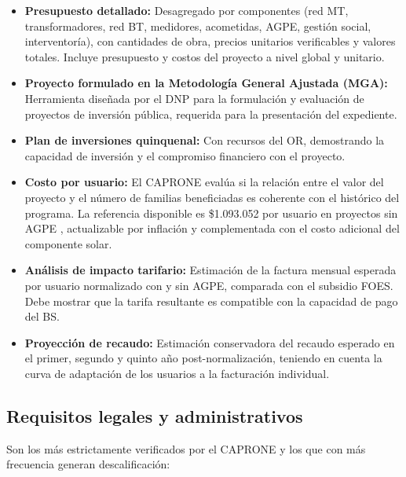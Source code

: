 \begin{itemize}
    \item \textbf{Presupuesto detallado:} Desagregado por componentes
    (red MT, transformadores, red BT, medidores, acometidas, AGPE,
    gestión social, interventoría), con cantidades de obra, precios
    unitarios verificables y valores totales. Incluye presupuesto y
    costos del proyecto a nivel global y unitario.

    \item \textbf{Proyecto formulado en la Metodología General Ajustada
    (MGA):} Herramienta diseñada por el DNP para la formulación y
    evaluación de proyectos de inversión pública, requerida para la
    presentación del expediente.

    \item \textbf{Plan de inversiones quinquenal:} Con recursos del OR,
    demostrando la capacidad de inversión y el compromiso financiero
    con el proyecto.

    \item \textbf{Costo por usuario:} El CAPRONE evalúa si la relación
    entre el valor del proyecto y el número de familias beneficiadas es
    coherente con el histórico del programa. La referencia disponible
    es \$1.093.052 por usuario en proyectos sin AGPE
    \parencite{CabralesSanjuan2015}, actualizable por inflación y
    complementada con el costo adicional del componente solar.

    \item \textbf{Análisis de impacto tarifario:} Estimación de la
    factura mensual esperada por usuario normalizado con y sin AGPE,
    comparada con el subsidio FOES. Debe mostrar que la tarifa
    resultante es compatible con la capacidad de pago del BS.

    \item \textbf{Proyección de recaudo:} Estimación conservadora del
    recaudo esperado en el primer, segundo y quinto año
    post-normalización, teniendo en cuenta la curva de adaptación de
    los usuarios a la facturación individual.
\end{itemize}

\subsection{Requisitos legales y administrativos}
\label{subsec:req_legales}

Son los más estrictamente verificados por el CAPRONE y los que con más
frecuencia generan descalificación:


